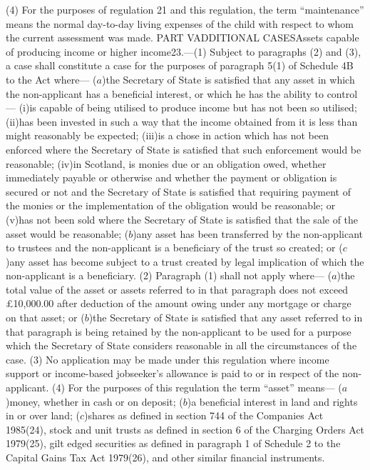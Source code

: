 \documentclass[a4paper]{article}
\begin{document}
(4) For the purposes of regulation 21 and this regulation, the term
“maintenance” means the normal day-to-day living expenses of the child with
respect to whom the current assessment was made.
PART VADDITIONAL CASESAssets capable of producing income or higher income23.—(1)
Subject to paragraphs (2) and (3), a case shall constitute a case for the
purposes of paragraph 5(1) of Schedule 4B to the Act where—
($a$)the Secretary of State is satisfied that any asset in which the non-applicant
has a beneficial interest, or which he has the ability to control—
(i)is capable of being utilised to produce income but has not been so utilised;
(ii)has been invested in such a way that the income obtained from it is less
than might reasonably be expected;
(iii)is a chose in action which has not been enforced where the Secretary of
State is satisfied that such enforcement would be reasonable;
(iv)in Scotland, is monies due or an obligation owed, whether immediately
payable or otherwise and whether the payment or obligation is secured or not and
the Secretary of State is satisfied that requiring payment of the monies or the
implementation of the obligation would be reasonable; or
(v)has not been sold where the Secretary of State is satisfied that the sale of
the asset would be reasonable;
($b$)any asset has been transferred by the non-applicant to trustees and the
non-applicant is a beneficiary of the trust so created; or
($c$)any asset has become subject to a trust created by legal implication of which
the non-applicant is a beneficiary.
(2) Paragraph (1) shall not apply where—
($a$)the total value of the asset or assets referred to in that paragraph does not
exceed £10,000.00 after deduction of the amount owing under any mortgage or
charge on that asset; or
($b$)the Secretary of State is satisfied that any asset referred to in that
paragraph is being retained by the non-applicant to be used for a purpose which
the Secretary of State considers reasonable in all the circumstances of the
case.
(3) No application may be made under this regulation where income support or
income-based jobseeker’s allowance is paid to or in respect of the
non-applicant.
(4) For the purposes of this regulation the term “asset” means—
($a$)money, whether in cash or on deposit;
($b$)a beneficial interest in land and rights in or over land;
($c$)shares as defined in section 744 of the Companies Act 1985(24), stock and
unit trusts as defined in section 6 of the Charging Orders Act 1979(25), gilt
edged securities as defined in paragraph 1 of Schedule 2 to the Capital Gains
Tax Act 1979(26), and other similar financial instruments.
\end{document}
